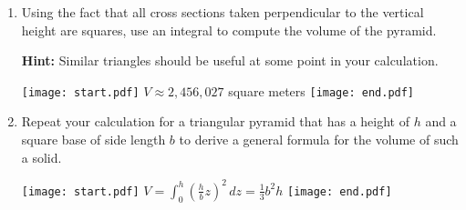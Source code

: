 \documentclass[12pt]{article}
\begin{document}
\begin{enumerate}
\begin{enumerate}
\item Using the fact that all cross sections taken perpendicular to the vertical height are squares, use an integral to compute the volume of the pyramid.

{\bf Hint:} Similar triangles should be useful at some point in your calculation.

\texttt{[image: start.pdf]}
{{$V\approx2,456,027$ square meters}}
\texttt{[image: end.pdf]}


\item Repeat your calculation for a triangular pyramid that has a height of $h$ and a square base of side length $b$ to derive a general formula for the volume of such a solid.

\texttt{[image: start.pdf]}
{{$V=\int_0^h \left(\frac{h}{b}z\right)^2 \,dz=\frac{1}{3}b^2h$}}
\texttt{[image: end.pdf]}


\end{enumerate}

\end{enumerate}
\end{document}
